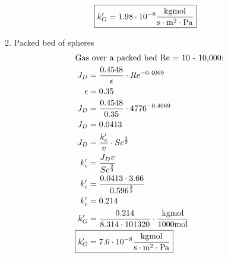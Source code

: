 \documentclass[12pt]{article}
\begin{document}
\begin{enumerate}
\begin{enumerate}
\begin{align*}
            \Aboxed{k_G' &= 1.98 \cdot 10^{-8} \frac{\mathrm{kgmol}}{\mathrm{s}\cdot\mathrm{m}^2\cdot\mathrm{Pa}}}
        \end{align*}
        \item Packed bed of spheres
        \begin{align*}
            \intertext{Gas over a packed bed Re = 10 - 10,000:}
            J_D &= \frac{0.4548}{\epsilon} \cdot Re^{-0.4069} \\
            \epsilon &= 0.35 \\ 
            J_D &= \frac{0.4548}{0.35} \cdot 4776^{-0.4069} \\
            J_D &= 0.0413 \\
            J_D &= \frac{k_c'}{v} \cdot Sc^{\frac{2}{3}} \\
            k_c' &= \frac{J_D v}{Sc^{\frac{2}{3}}} \\
            k_c' &= \frac{0.0413 \cdot 3.66}{0.596^{\frac{2}{3}}} \\
            k_c' &= 0.214 \\
            k_G' &= \frac{0.214}{8.314 \cdot 101320} \cdot \frac{\mathrm{kgmol}}{1000\mathrm{mol}} \\
            \Aboxed{k_G' &= 7.6 \cdot 10^{-8} \frac{\mathrm{kgmol}}{\mathrm{s}\cdot\mathrm{m}^2\cdot\mathrm{Pa}}}
        \end{align*}
    \end{enumerate}


\end{enumerate}
\end{document}
